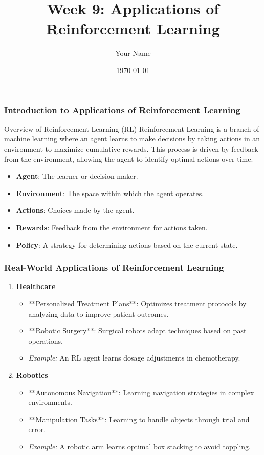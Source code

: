 \documentclass{beamer}
\title{Week 9: Applications of Reinforcement Learning}
\author{Your Name}
\institute{Your Institution}
\date{\today}
\begin{document}
\frame{\titlepage}

\begin{frame}[fragile]
    \frametitle{Introduction to Applications of Reinforcement Learning}
    \begin{block}{Overview of Reinforcement Learning (RL)}
        Reinforcement Learning is a branch of machine learning where an agent learns to make decisions by taking actions in an environment to maximize cumulative rewards. This process is driven by feedback from the environment, allowing the agent to identify optimal actions over time.
    \end{block}

    \begin{itemize}
        \item \textbf{Agent}: The learner or decision-maker.
        \item \textbf{Environment}: The space within which the agent operates.
        \item \textbf{Actions}: Choices made by the agent.
        \item \textbf{Rewards}: Feedback from the environment for actions taken.
        \item \textbf{Policy}: A strategy for determining actions based on the current state.
    \end{itemize}
\end{frame}

\begin{frame}[fragile]
    \frametitle{Real-World Applications of Reinforcement Learning}
    \begin{enumerate}
        \item \textbf{Healthcare}
        \begin{itemize}
            \item **Personalized Treatment Plans**: Optimizes treatment protocols by analyzing data to improve patient outcomes.
            \item **Robotic Surgery**: Surgical robots adapt techniques based on past operations.
            \item \textit{Example:} An RL agent learns dosage adjustments in chemotherapy.
        \end{itemize}
        
        \item \textbf{Robotics}
        \begin{itemize}
            \item **Autonomous Navigation**: Learning navigation strategies in complex environments.
            \item **Manipulation Tasks**: Learning to handle objects through trial and error.
            \item \textit{Example:} A robotic arm learns optimal box stacking to avoid toppling.
        \end{itemize}
    \end{enumerate}
\end{frame}
\end{document}
